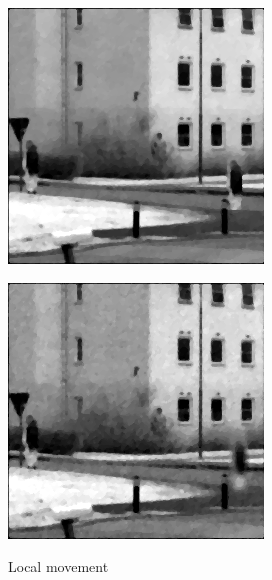 \begin{figure}[H]
\begin{minipage}[t]{0.32\textwidth}
    \includegraphics[width = \textwidth]{result/dynamic/local/local_whole_time_ref.png}
    \label{fig:local_2}
\end{minipage}
\begin{minipage}[t]{0.32\textwidth}
    \includegraphics[width = \textwidth]{result/dynamic/local/local_whole_time_res_psnr_29_snr_25_sssim_91.png}
    \label{fig:local_3}
\end{minipage}
    \caption{Local movement}
    \label{fig:local_dyn}
\end{figure}

